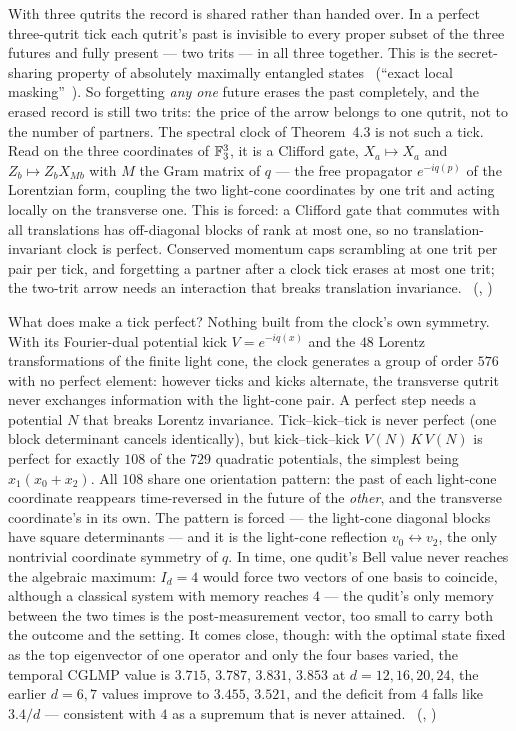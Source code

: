 With three qutrits the record is shared rather than handed over. In a perfect three-qutrit tick each qutrit's past is
invisible to every proper subset of the three futures and fully present --- two trits --- in all three together. This is
the secret-sharing property of absolutely maximally entangled states~\cite{Helwig2012} (``exact local
masking''~\cite{Pahari2026}). So forgetting \emph{any one} future erases the past completely, and the erased record is
still two trits: the price of the arrow belongs to one qutrit, not to the number of partners. The spectral clock of
Theorem~4.3 is not such a tick. Read on the three coordinates of $\mathbb{F}_3^3$, it is a Clifford gate, $X_a\mapsto X_a$ and
$Z_b\mapsto Z_bX_{Mb}$ with $M$ the Gram matrix of $q$ --- the free propagator $e^{-iq(p)}$ of the Lorentzian form,
coupling the two light-cone coordinates by one trit and acting locally on the transverse one. This is forced: a Clifford
gate that commutes with all translations has off-diagonal blocks of rank at most one, so no translation-invariant clock
is perfect. Conserved momentum caps scrambling at one trit per pair per tick, and forgetting a partner after a clock tick
erases at most one trit; the two-trit arrow needs an interaction that breaks translation invariance.
\tierC\ (, )

What does make a tick perfect? Nothing built from the clock's own symmetry. With its Fourier-dual potential kick
$V=e^{-iq(x)}$ and the $48$ Lorentz transformations of the finite light cone, the clock generates a group of order $576$
with no perfect element: however ticks and kicks alternate, the transverse qutrit never exchanges information with the
light-cone pair. A perfect step needs a potential $N$ that breaks Lorentz invariance. Tick--kick--tick is never perfect
(one block determinant cancels identically), but kick--tick--kick $V(N)\,K\,V(N)$ is perfect for exactly $108$ of the
$729$ quadratic potentials, the simplest being $x_1(x_0+x_2)$. All $108$ share one orientation pattern: the past of each
light-cone coordinate reappears time-reversed in the future of the \emph{other}, and the transverse coordinate's in its
own. The pattern is forced --- the light-cone diagonal blocks have square determinants --- and it is the light-cone
reflection $v_0\leftrightarrow v_2$, the only nontrivial coordinate symmetry of $q$. In time, one qudit's Bell value never reaches the algebraic maximum: $I_d=4$ would force two vectors of one basis to
coincide, although a classical system with memory reaches $4$ --- the qudit's only memory between the two times is the
post-measurement vector, too small to carry both the outcome and the setting. It comes close, though: with the optimal
state fixed as the top eigenvector of one operator and only the four bases varied, the temporal CGLMP value is $3.715$,
$3.787$, $3.831$, $3.853$ at $d=12,16,20,24$, the earlier $d=6,7$ values improve to $3.455$, $3.521$, and the deficit
from $4$ falls like $3.4/d$ --- consistent with $4$ as a supremum that is never attained.
\tierC\ (, )

